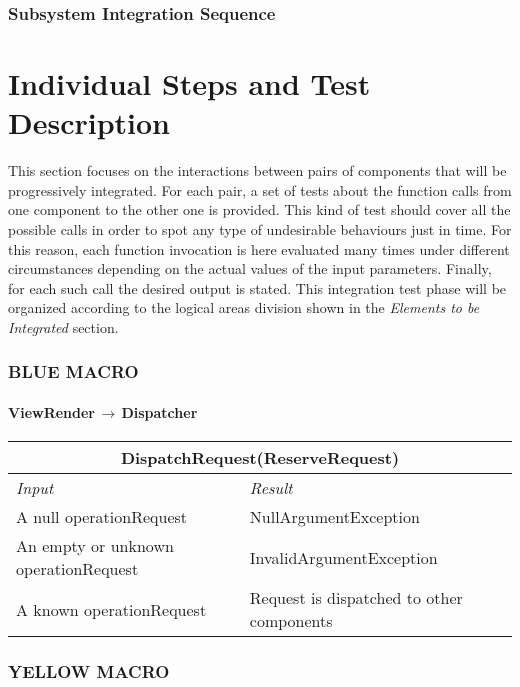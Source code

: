 \documentclass[11pt,a4paper]{report}
\begin{document}
\subsection{Subsystem Integration Sequence}
\chapter{Individual Steps and Test Description}
This section focuses on the interactions between pairs of components that will be progressively integrated. For each pair, a set of tests about the  function calls from one component to the other one is provided. This kind of test should cover all the possible calls in order to spot any type of undesirable behaviours just in time. For this reason, each function invocation is here evaluated many times under different circumstances depending on the actual values of the input parameters. Finally, for each such call the desired output is stated.
This integration test phase will be organized according to the logical areas division shown in the \textit{Elements to be Integrated} section.
\subsection{BLUE MACRO}
\subsubsection{ViewRender$\,\to\,$Dispatcher}
\begin{tabularx}{\textwidth}{|X|X|}
	\hline
	\multicolumn{2}{|c|}{\textbf{DispatchRequest(ReserveRequest)}}\\
	\hline
	\textit{Input} & \textit{Result}\\
	\hline
	A null operationRequest & NullArgumentException\\
	\hline
	An empty or unknown operationRequest & InvalidArgumentException\\
	\hline
	A known operationRequest & Request is dispatched to other components\\
	\hline
\end{tabularx}
\subsection{YELLOW MACRO}
\end{document}
